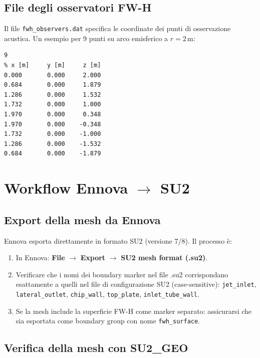 \documentclass[11pt,a4paper]{article}
\newcommand{\ttcfg}[1]{\texttt{\color{codegray}#1}}
\begin{document}
\subsection{File degli osservatori FW-H}

Il file \texttt{fwh\_observers.dat} specifica le coordinate dei punti di osservazione acustica. Un esempio per 9 punti su arco emisferico a $r = 2$\,m:

\begin{lstlisting}[style=SU2cfg, caption={Esempio di file \texttt{fwh\_observers.dat}: 9 osservatori su arco emisferico a r=2\,m.}, label={lst:fwh}]
% Numero di osservatori
9
% x [m]     y [m]     z [m]
0.000       0.000     2.000
0.684       0.000     1.879
1.286       0.000     1.532
1.732       0.000     1.000
1.970       0.000     0.348
1.970       0.000    -0.348
1.732       0.000    -1.000
1.286       0.000    -1.532
0.684       0.000    -1.879
\end{lstlisting}

\section{Workflow Ennova $\rightarrow$ SU2}
\label{sec:workflow}

\subsection{Export della mesh da Ennova}

Ennova esporta direttamente in formato SU2 (versione 7/8). Il processo è:

\begin{enumerate}
  \item In Ennova: \textbf{File} $\rightarrow$ \textbf{Export} $\rightarrow$ \textbf{SU2 mesh format (.su2)}.
  \item Verificare che i nomi dei boundary marker nel file .su2 corrispondano esattamente a quelli nel file di configurazione SU2 (case-sensitive): \ttcfg{jet\_inlet}, \ttcfg{lateral\_outlet}, \ttcfg{chip\_wall}, \ttcfg{top\_plate}, \ttcfg{inlet\_tube\_wall}.
  \item Se la mesh include la superficie FW-H come marker separato: assicurarsi che sia esportata come boundary group con nome \ttcfg{fwh\_surface}.
\end{enumerate}

\subsection{Verifica della mesh con SU2\_GEO}
\end{document}

